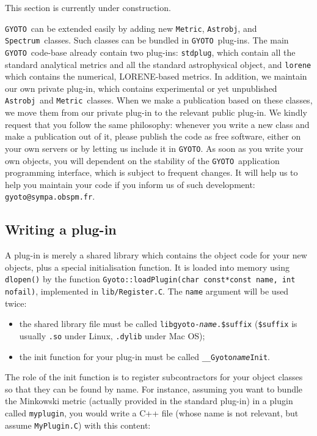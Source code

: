 \documentclass[a4paper,12pt]{article}
\newcommand{\GYOTO}{\texttt{GYOTO}}
\newcommand{\Metric}{\texttt{Metric}}
\newcommand{\Astrobj}{\texttt{Astrobj}}
\newcommand{\Spectrum}{\texttt{Spectrum}}
\begin{document}
This section is currently under construction.

\GYOTO\ can be extended easily by adding new \Metric, \Astrobj, and
\Spectrum\ classes. Such classes can be bundled in \GYOTO\
plug-ins. The main \GYOTO\ code-base already contain two plug-ins:
\texttt{stdplug}, which contain all the standard analytical metrics
and all the standard astrophysical object, and \texttt{lorene} which
contains the numerical, LORENE-based metrics. In addition, we maintain
our own private plug-in, which contains experimental or yet
unpublished \Astrobj\ and \Metric\ classes. When we make a publication
based on these classes, we move them from our private plug-in to the
relevant public plug-in. We kindly request that you follow the same
philosophy: whenever you write a new class and make a publication out
of it, please publish the code as free software, either on your own
servers or by letting us include it in \GYOTO. As soon as you write
your own objects, you will dependent on the stability of the \GYOTO\
application programming interface, which is subject to frequent
changes. It will help us to help you maintain your code if you inform
us of such development: \texttt{gyoto@sympa.obspm.fr}.

\subsection{Writing a plug-in}
\label{sect:plug-in}

A plug-in is merely a shared library which contains the object code
for your new objects, plus a special initialisation function. It is
loaded into memory using \texttt{dlopen()} by the function
\texttt{Gyoto::loadPlugin(char const*const name, int nofail)},
implemented in \texttt{lib/Register.C}. The \texttt{name} argument
will be used twice:
\begin{itemize}
\item the shared library file must be called
  \texttt{libgyoto-\emph{name}.\$suffix} (\texttt{\$suffix} is usually
  \texttt{.so} under Linux, \texttt{.dylib} under Mac OS);
\item the init function for your plug-in must be called
  \texttt{\_\_Gyoto\emph{name}Init}.
\end{itemize}

The role of the init function is to register subcontractors for your
object classes so that they can be found by name. For instance,
assuming you want to bundle the Minkowski metric (actually provided in
the standard plug-in) in a plugin called \texttt{myplugin}, you would
write a C++ file (whose name is not relevant, but assume
\texttt{MyPlugin.C}) with this content:
\end{document}
